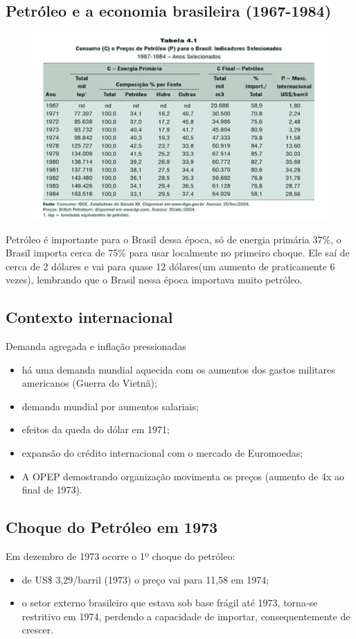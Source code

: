 \documentclass[a4paper,12pt]{article}[abntex2]
\begin{document}
\subsection{\textbf{Petróleo e a economia brasileira (1967-1984)}}
\begin{figure}[H]
    \centering
    \includegraphics[width=0.7\linewidth]{Imagens/a6i1.png}
\end{figure}
Petróleo é importante para o Brasil dessa época, só de energia primária 37\%, o Brasil importa cerca de 75\% para usar localmente no primeiro choque. Ele saí de cerca de 2 dólares e vai para quase 12 dólares(um aumento de praticamente 6 vezes), lembrando que o Brasil nessa época importava muito petróleo.


\subsection{\textbf{Contexto internacional}}
Demanda agregada e inflação pressionadas\begin{itemize}
    \item há uma demanda mundial aquecida com os aumentos dos gastos militares americanos (Guerra do Vietnã);
    \item demanda mundial por aumentos salariais;
    \item efeitos da queda do dólar em 1971;
    \item expansão do crédito internacional com o mercado de Euromoedas;
    \item A OPEP demostrando organização movimenta os preços (aumento de 4x ao final de 1973).
\end{itemize}

\subsection{\textbf{Choque do Petróleo em 1973}}
Em dezembro de 1973 ocorre o 1º choque do petróleo:\begin{itemize}
    \item de US\$ 3,29/barril (1973) o preço vai para 11,58 em 1974; 
    \item o setor externo brasileiro que estava sob base frágil até 1973, torna-se restritivo em 1974, perdendo a capacidade de importar, consequentemente de crescer.
\end{itemize}
\end{document}
